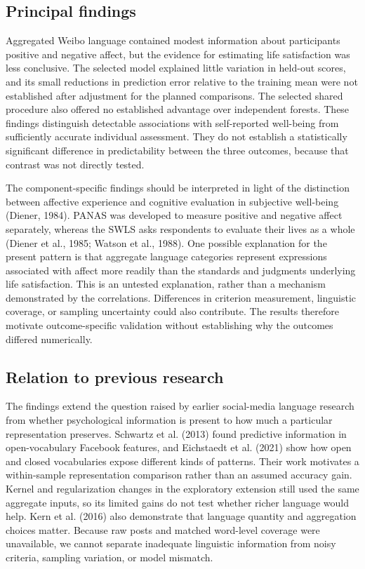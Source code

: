 \documentclass[11pt,letterpaper]{article}
\begin{document}
\subsection{Principal findings}\label{principal-findings}

Aggregated Weibo language contained modest information about participants\textquotesingle{} positive and negative affect, but the evidence for estimating life satisfaction was less conclusive. The selected model explained little variation in held-out scores, and its small reductions in prediction error relative to the training mean were not established after adjustment for the planned comparisons. The selected shared procedure also offered no established advantage over independent forests. These findings distinguish detectable associations with self-reported well-being from sufficiently accurate individual assessment. They do not establish a statistically significant difference in predictability between the three outcomes, because that contrast was not directly tested.

The component-specific findings should be interpreted in light of the distinction between affective experience and cognitive evaluation in subjective well-being (Diener, 1984). PANAS was developed to measure positive and negative affect separately, whereas the SWLS asks respondents to evaluate their lives as a whole (Diener et al., 1985; Watson et al., 1988). One possible explanation for the present pattern is that aggregate language categories represent expressions associated with affect more readily than the standards and judgments underlying life satisfaction. This is an untested explanation, rather than a mechanism demonstrated by the correlations. Differences in criterion measurement, linguistic coverage, or sampling uncertainty could also contribute. The results therefore motivate outcome-specific validation without establishing why the outcomes differed numerically.

\subsection{Relation to previous research}\label{relation-to-previous-research}

The findings extend the question raised by earlier social-media language research from whether psychological information is present to how much a particular representation preserves. Schwartz et al. (2013) found predictive information in open-vocabulary Facebook features, and Eichstaedt et al. (2021) show how open and closed vocabularies expose different kinds of patterns. Their work motivates a within-sample representation comparison rather than an assumed accuracy gain. Kernel and regularization changes in the exploratory extension still used the same aggregate inputs, so its limited gains do not test whether richer language would help. Kern et al. (2016) also demonstrate that language quantity and aggregation choices matter. Because raw posts and matched word-level coverage were unavailable, we cannot separate inadequate linguistic information from noisy criteria, sampling variation, or model mismatch.
\end{document}
